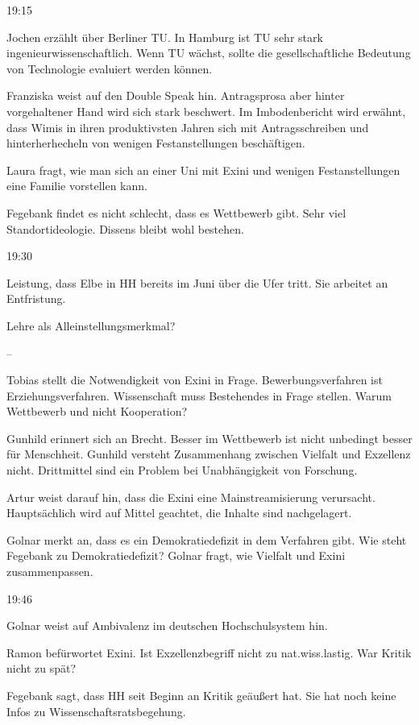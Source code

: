 \documentclass[ngerman,headheight=70pt]{scrartcl}
\begin{document}
    19:15

    Jochen erzählt über Berliner TU. In Hamburg ist TU sehr stark
    ingenieurwissenschaftlich. Wenn TU wächst, sollte die gesellschaftliche
    Bedeutung von Technologie evaluiert werden können.

    Franziska weist auf den Double Speak hin. Antragsprosa aber hinter
    vorgehaltener Hand wird sich stark beschwert. Im Imbodenbericht wird
    erwähnt, dass Wimis in ihren produktivsten Jahren sich mit Antragsschreiben
    und hinterherhecheln von wenigen Festanstellungen beschäftigen.

    Laura fragt, wie man sich an einer Uni mit Exini und wenigen Festanstellungen
    eine Familie vorstellen kann.

    Fegebank findet es nicht schlecht, dass es Wettbewerb gibt. Sehr viel
    Standortideologie. Dissens bleibt wohl bestehen.

    19:30

    Leistung, dass Elbe in HH bereits im Juni über die Ufer tritt.
    Sie arbeitet an Entfristung.

    Lehre als Alleinstellungsmerkmal?

    --

    Tobias stellt die Notwendigkeit von Exini in Frage. Bewerbungsverfahren
    ist Erziehungsverfahren. Wissenschaft muss Bestehendes in Frage stellen.
    Warum Wettbewerb und nicht Kooperation?

    Gunhild erinnert sich an Brecht. Besser im Wettbewerb ist nicht unbedingt
    besser für Menschheit. Gunhild versteht Zusammenhang zwischen Vielfalt
    und Exzellenz nicht. Drittmittel sind ein Problem bei Unabhängigkeit von
    Forschung.

    Artur weist darauf hin, dass die Exini eine Mainstreamisierung verursacht.
    Hauptsächlich wird auf Mittel geachtet, die Inhalte sind nachgelagert.

    Golnar merkt an, dass es ein Demokratiedefizit in dem Verfahren gibt.
    Wie steht Fegebank zu Demokratiedefizit? Golnar fragt, wie Vielfalt und
    Exini zusammenpassen.

    19:46

    Golnar weist auf Ambivalenz im deutschen Hochschulsystem hin.

    Ramon befürwortet Exini. Ist Exzellenzbegriff nicht zu nat.wiss.lastig.
    War Kritik nicht zu spät?

    Fegebank sagt, dass HH seit Beginn an Kritik geäußert hat. Sie hat noch keine
    Infos zu Wissenschaftsratsbegehung.
\end{document}
